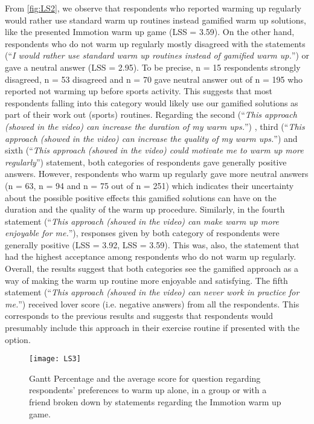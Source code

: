 From \ref{fig:LS2}, we observe that respondents who reported warming up regularly would rather use standard warm up routines instead gamified warm up solutions, like the presented Immotion warm up game (LSS = 3.59). On the other hand, respondents who do not warm up regularly mostly disagreed with the statements (``\textit{I would rather use standard warm up routines instead of gamified warm up.}'') or gave a neutral answer (LSS = 2.95). To be precise, n = 15 respondents strongly disagreed, n = 53 disagreed and n = 70 gave neutral answer out of n = 195 who reported not warming up before sports activity. This suggests that most respondents falling into this category would likely use our gamified solutions as part of their work out (sports) routines. Regarding the second (``\textit{This approach (showed in the video) can increase the duration of my warm ups.}'') , third (``\textit{This approach (showed in the video) can increase the quality of my warm ups.}'') and sixth (``\textit{This approach (showed in the video) could motivate me to warm up more regularly}'') statement, both categories of respondents gave generally positive answers. However, respondents who warm up regularly gave more neutral answers (n = 63, n = 94 and n = 75 out of n = 251) which indicates their uncertainty about the possible positive effects this gamified solutions can have on the duration and the quality of the warm up procedure.  Similarly, in the fourth statement (``\textit{This approach (showed in the video) can make warm up more enjoyable for me.}''), responses given by both category of respondents were generally positive (LSS = 3.92, LSS = 3.59). This was, also, the statement that had the highest acceptance among respondents who do not warm up regularly. Overall, the results suggest that both categories see the gamified approach as a way of making the warm up routine more enjoyable and satisfying. The fifth statement (``\textit{This approach (showed in the video) can never work in practice for me.}'') received lover score (i.e. negative answers) from all the respondents. This corresponds to the previous results and suggests that respondents would presumably include this approach in their exercise routine if presented with the option.
\begin{figure}[h]
    \centering
    \texttt{[image: LS3]}
    \caption{Gantt Percentage and the average score for question regarding respondents' preferences to warm up alone, in a group or with a friend broken down by statements regarding the Immotion warm up game.}
    \label{fig:LS3}
\end{figure}\\ 
